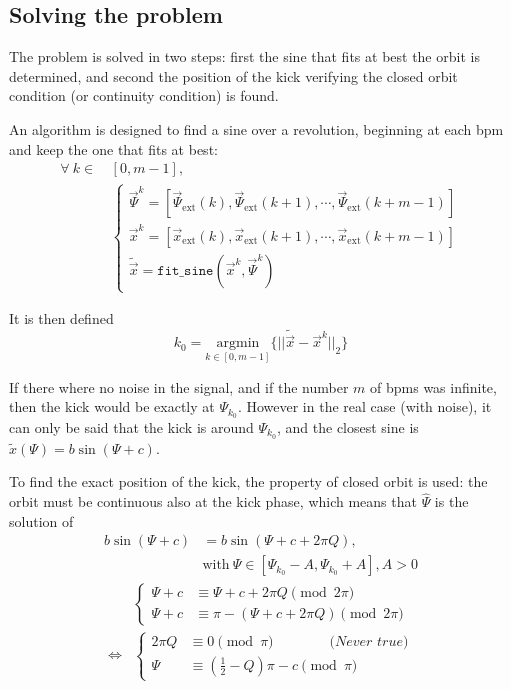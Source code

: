 \subsection{Solving the problem}

The problem is solved in two steps: first the sine that fits at best the orbit is determined, and second the position of the kick verifying the closed orbit condition (or continuity condition) is found.

An algorithm is designed to find a sine over a revolution, beginning at each \gls{bpm} and keep the one that fits at best:
\begin{align}
\forall~k \in \, &[0,m-1], \nonumber \\
&\begin{cases}
\vec{\Psi}^k = [\vec{\Psi}_\mathrm{ext}(k), \vec{\Psi}_\mathrm{ext}(k+1), \cdots,  \vec{\Psi}_\mathrm{ext}(k+m-1)]\\
\vec{x}^k = [\vec{x}_\mathrm{ext}(k), \vec{x}_\mathrm{ext}(k+1), \cdots,  \vec{x}_\mathrm{ext}(k+m-1)]\\
\tilde{\vec{x}} = \mathtt{fit\_sine}(\vec{x}^k, \vec{\Psi}^k)
\end{cases}
\end{align}

It is then defined
\begin{equation}
k_0 = \underset{k \in [0, m-1]}{\textrm{argmin}}\{||\tilde{\vec{x}}-\vec{x}^k||_2\}
\end{equation}

If there where no noise in the signal, and if the number $m$ of \glspl{bpm} was infinite, then the kick would be exactly at $\Psi_{k_0}$. However in the real case (with noise), it can only be said that the kick is around $\Psi_{k_0}$, and the closest sine is $\tilde{x}(\Psi) = b \sin(\Psi + c)$. 

To find the exact position of the kick, the property of closed orbit is used: the orbit must be continuous also at the kick phase, which means that $\hat{\Psi}$ is the solution of
\begin{align}
b \sin(\Psi + c) &= b\sin(\Psi+c+2 \pi Q),\\
& \mathrm{with}~ \Psi \in [\Psi_{k_0}-A, \Psi_{k_0}+A] , A>0 \nonumber
\end{align}
\begin{align}
&\begin{cases}
\Psi + c &\equiv \Psi + c + 2 \pi Q \pmod{2 \pi} \\
\Psi + c &\equiv \pi - (\Psi + c + 2 \pi Q) \pmod{2 \pi}
\end{cases} \nonumber\\
\iff &\begin{cases} 
2 \pi Q &\equiv 0\pmod \pi \qquad\qquad\textit{(Never true)}\\
\Psi &\equiv \left(\frac{1}{2} - Q\right) \pi - c \pmod \pi
\end{cases} \nonumber
\end{align}

